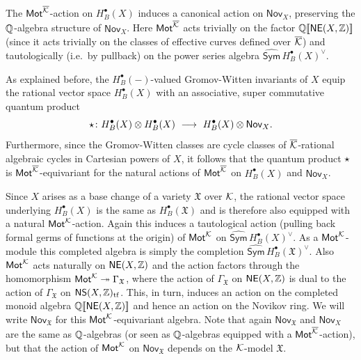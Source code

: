 \documentclass[twoside,leqno]{article}
\numberwithin{equation}{section}
\theoremstyle{plain}
\theoremstyle{definition}
\begin{document}
The $\mathsf{Mot}^{\overline{\mathcal K}}$-action on $H^{\bullet}_{B}(X)$
induces a canonical action on $\mathsf{Nov}_{X}$, preserving the
$\mathbb Q$-algebra structure of $\mathsf{Nov}_{X}$. Here $\mathsf{Mot}^{\overline{\mathcal K}}$
acts trivially on the factor $\mathbb Q[\![\mathsf{NE}(X,\mathbb Z)]\!]$ (since it
acts trivially on the classes of effective curves defined over
$\overline{\mathcal K}$) and tautologically (i.e.\ by pullback) on the power series
algebra $\widehat{\mathsf{Sym}}\, H^{\bullet}_{B}(X)^{\vee}$.


As explained before, the $H^{\bullet}_{B}(-)$-valued
Gromov-Witten invariants of $X$
equip the rational vector space $H^{\bullet}_{B}(X)$ with an associative,
super commutative quantum
product
\[
\qup \colon H^{\bullet}_{B}(X)\otimes H^{\bullet}_{B}(X)
\ \longrightarrow
\ 
H^{\bullet}_{B}(X)\otimes \mathsf{Nov}_{X}.
\]
Furthermore, since the Gromov-Witten classes are cycle classes of
$\overline{\mathcal K}$-rational
algebraic cycles in Cartesian powers of $X$, it follows that the
quantum product $\star$ is $\mathsf{Mot}^{\overline{\mathcal K}}$-equivariant for the
natural actions of $\mathsf{Mot}^{\overline{\mathcal K}}$ on $H^{\bullet}_{B}(X)$ and
$\mathsf{Nov}_{X}$. 

Since $X$ arises as a base change of a variety $\mathfrak{X}$ over
$\mathcal K$, the rational vector space underlying $H^{\bullet}_{B}(X)$ is
the same as $H^{\bullet}_{B}(\mathfrak{X})$ and is therefore also
equipped with a natural $\mathsf{Mot}^{\mathcal K}$-action. Again this induces a
tautological action (pulling back formal germs of functions at the
origin) of $\mathsf{Mot}^{\mathcal K}$ on $\widehat{\mathsf{Sym}}\,
H^{\bullet}_{B}(X)^{\vee}$. As a $\mathsf{Mot}^{\mathcal K}$-module this completed
algebra is simply the completion $\widehat{\mathsf{Sym}}\,
H^{\bullet}_{B}(\mathfrak{X})^{\vee}$. Also $\mathsf{Mot}^{\mathcal K}$ acts
naturally on $\mathsf{NE}(X,\mathbb Z)$ and the action factors through the
homomorphism $\mathsf{Mot}^{\mathcal K} \twoheadrightarrow \Gamma_{\mathfrak{X}}$,
where the action of $\Gamma_{\mathfrak{X}}$ on $\mathsf{NE}(X,\mathbb Z)$
is dual to the action of $\Gamma_{\mathfrak{X}}$ on
$\mathsf{NS}(X,\mathbb Z)_{\operatorname{tf}}$. This, in turn, induces an action on
the completed monoid algebra $\mathbb Q[\![\mathsf{NE}(X,\mathbb Z)]\!]$ and hence
an action on the Novikov ring. We will write
$\mathsf{Nov}_{\mathfrak{X}}$ for this $\mathsf{Mot}^{\mathcal K}$-equivariant
algebra. Note that again $\mathsf{Nov}_{\mathfrak{X}}$ and
$\mathsf{Nov}_{X}$ are the same as $\mathbb Q$-algebras (or seen as
$\mathbb Q$-algebras equipped with a $\mathsf{Mot}^{\overline{\mathcal K}}$-action), but that the
action of $\mathsf{Mot}^{\mathcal K}$ on $\mathsf{Nov}_{\mathfrak{X}}$ depends on
the $\mathcal K$-model $\mathfrak{X}$.
\end{document}
